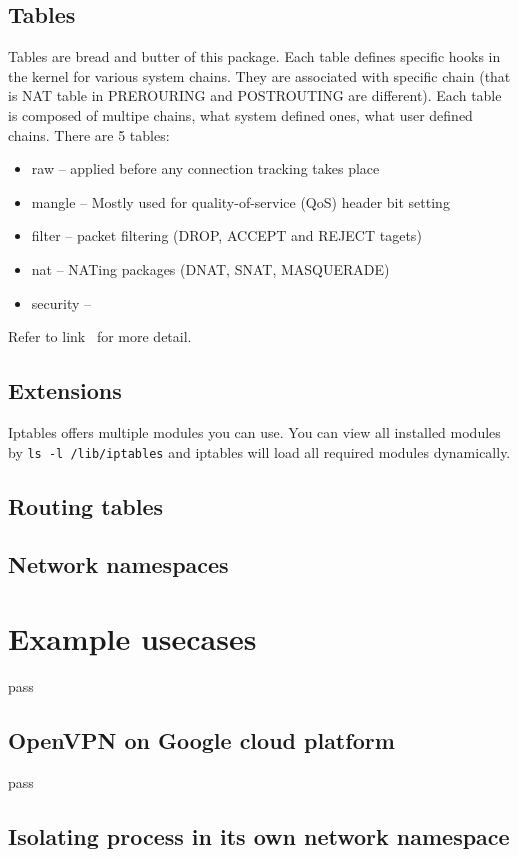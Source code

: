 \documentclass[times, utf8, seminar, english]{fer}
\begin{document}
\section{Tables}
    Tables are bread and butter of this package. Each table defines specific hooks in the kernel for various system chains. They are associated with specific chain (that is NAT table in PREROURING and POSTROUTING are different). Each table is composed of multipe chains, what system defined ones, what user defined chains.
    There are 5 tables:
    \begin{itemize}
        \item raw -- applied before any connection tracking takes place
        \item mangle -- Mostly used for quality-of-service (QoS) header bit setting
        \item filter -- packet filtering (DROP, ACCEPT and REJECT tagets)
        \item nat -- NATing packages (DNAT, SNAT, MASQUERADE)
        \item security --
    \end{itemize}
    Refer to link~\cite{Iptables27:online} for more detail.

    \section{Extensions}
    Iptables offers multiple modules you can use.
    You can view all installed modules by \texttt{ls -l /lib/iptables} and iptables will load all required modules dynamically.


\section{Routing tables}
\section{Network namespaces}


\chapter{Example usecases}
pass
\section{OpenVPN on Google cloud platform}
pass
\section{Isolating process in its own network namespace}
\end{document}
